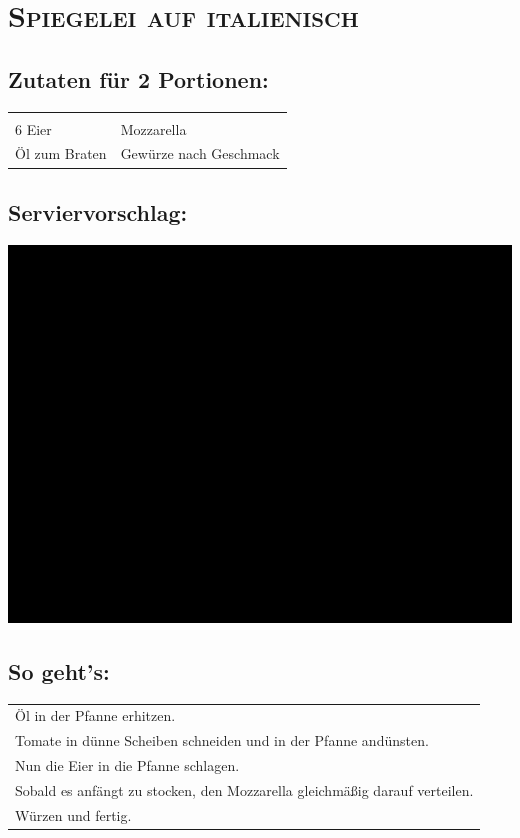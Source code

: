 \section{\textsc{Spiegelei auf italienisch}}

\subsection*{Zutaten für 2 Portionen:}

\begin{tabular}{p{7.5cm} p{7.5cm}}
	& \\
	6 Eier & Mozzarella \\
	Öl zum Braten & Gewürze nach Geschmack
\end{tabular}

\subsection*{Serviervorschlag:}

\includegraphics[width=\textwidth]{img/ph.jpg} \cite{itaspiegelei}

\subsection*{So geht's:}

\begin{tabular}{p{15cm}}
	\\
  Öl in der Pfanne erhitzen.\\
  Tomate in dünne Scheiben schneiden und in der Pfanne andünsten.\\
  Nun die Eier in die Pfanne schlagen.\\
  Sobald es anfängt zu stocken, den Mozzarella gleichmäßig darauf verteilen.\\
  Würzen und fertig.
\end{tabular}
